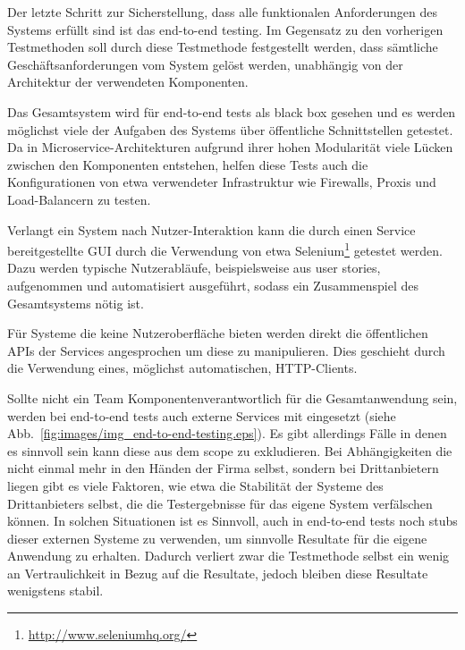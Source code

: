 \documentclass[12pt,a4paper,bibliography=totocnumbered,listof=totocnumbered]{scrartcl}
\begin{document}
Der letzte Schritt zur Sicherstellung, dass alle funktionalen Anforderungen des Systems erfüllt sind ist das end-to-end testing. Im Gegensatz zu den vorherigen Testmethoden soll durch diese Testmethode festgestellt werden, dass sämtliche Geschäftsanforderungen vom System gelöst werden, unabhängig von der Architektur der verwendeten Komponenten.~\cite{clemson}

Das Gesamtsystem wird für end-to-end tests als black box gesehen und es werden möglichst viele der Aufgaben des Systems über öffentliche Schnittstellen getestet. Da in Microservice-Architekturen aufgrund ihrer hohen Modularität viele Lücken zwischen den Komponenten entstehen, helfen diese Tests auch die Konfigurationen von etwa verwendeter Infrastruktur wie Firewalls, Proxis und Load-Balancern zu testen.\cite{clemson}

Verlangt ein System nach Nutzer-Interaktion kann die durch einen Service bereitgestellte GUI durch die Verwendung von etwa Selenium\footnote{\url{http://www.seleniumhq.org/}} getestet werden. Dazu werden typische Nutzerabläufe, beispielsweise aus user stories, aufgenommen und automatisiert ausgeführt, sodass ein Zusammenspiel des Gesamtsystems nötig ist.\cite{clemson}

Für Systeme die keine Nutzeroberfläche bieten werden direkt die öffentlichen \acp{API} der Services angesprochen um diese zu manipulieren. Dies geschieht durch die Verwendung eines, möglichst automatischen, HTTP-Clients.\cite{clemson}


Sollte nicht ein Team Komponentenverantwortlich für die Gesamtanwendung sein,  werden bei end-to-end tests auch externe Services mit eingesetzt (siehe Abb.~\ref{fig:images/img_end-to-end-testing.eps}). Es gibt allerdings Fälle in denen es sinnvoll sein kann diese aus dem scope zu exkludieren. Bei Abhängigkeiten die nicht einmal mehr in den Händen der Firma selbst, sondern bei Drittanbietern liegen gibt es viele Faktoren, wie etwa die Stabilität der Systeme des Drittanbieters selbst, die die Testergebnisse für das eigene System verfälschen können. In solchen Situationen ist es Sinnvoll, auch in end-to-end tests noch stubs dieser externen Systeme zu verwenden, um sinnvolle Resultate für die eigene Anwendung zu erhalten. Dadurch verliert zwar die Testmethode selbst ein wenig an Vertraulichkeit in Bezug auf die Resultate, jedoch bleiben diese Resultate wenigstens stabil.\cite{clemson}
\end{document}
